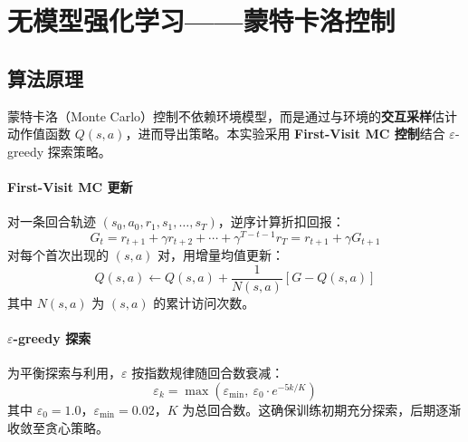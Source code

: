 \documentclass[12pt,a4paper]{ctexart}
\begin{document}
\section{无模型强化学习——蒙特卡洛控制}

\subsection{算法原理}

蒙特卡洛（Monte Carlo）控制不依赖环境模型，而是通过与环境的\textbf{交互采样}估计动作值函数 $Q(s,a)$，进而导出策略。本实验采用 \textbf{First-Visit MC 控制}结合 $\varepsilon$-greedy 探索策略。

\paragraph{First-Visit MC 更新}
对一条回合轨迹 $(s_0, a_0, r_1, s_1, \ldots, s_T)$，逆序计算折扣回报：
\begin{equation}
    G_t = r_{t+1} + \gamma r_{t+2} + \cdots + \gamma^{T-t-1} r_T = r_{t+1} + \gamma G_{t+1}
\end{equation}
对每个首次出现的 $(s, a)$ 对，用增量均值更新：
\begin{equation}
    Q(s,a) \leftarrow Q(s,a) + \frac{1}{N(s,a)}\left[G - Q(s,a)\right]
\end{equation}
其中 $N(s,a)$ 为 $(s,a)$ 的累计访问次数。

\paragraph{$\varepsilon$-greedy 探索}
为平衡探索与利用，$\varepsilon$ 按指数规律随回合数衰减：
\begin{equation}
    \varepsilon_k = \max\left(\varepsilon_{\min},\ \varepsilon_0 \cdot e^{-5 k / K}\right)
\end{equation}
其中 $\varepsilon_0 = 1.0$，$\varepsilon_{\min} = 0.02$，$K$ 为总回合数。这确保训练初期充分探索，后期逐渐收敛至贪心策略。


\end{document}
